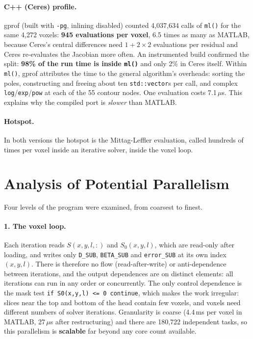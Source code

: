 \documentclass[11pt]{article}
\begin{document}
\paragraph{C++ (Ceres) profile.} gprof (built with \texttt{-pg}, inlining disabled) counted
4,037,634 calls of \texttt{ml()} for the same 4,272 voxels: \textbf{945 evaluations per voxel},
6.5 times as many as MATLAB, because Ceres's central differences need $1 + 2\times2$
evaluations per residual and Ceres re-evaluates the Jacobian more often. An instrumented build
confirmed the split: \textbf{98\% of the run time is inside \texttt{ml()}} and only 2\% in Ceres
itself. Within \texttt{ml()}, gprof attributes the time to the general algorithm's overheads:
sorting the poles, constructing and freeing about ten \texttt{std::vector}s per call, and complex
\texttt{log}/\texttt{exp}/\texttt{pow} at each of the 55 contour nodes. One evaluation costs
7.1\,$\mu$s. This explains why the compiled port is \emph{slower} than MATLAB.

\paragraph{Hotspot.} In both versions the hotspot is the Mittag-Leffler evaluation, called
hundreds of times per voxel inside an iterative solver, inside the voxel loop.

\section{Analysis of Potential Parallelism}
\label{sec:analysis}

Four levels of the program were examined, from coarsest to finest.

\paragraph{1. The voxel loop.} Each iteration reads $S(x,y,l,:)$ and $S_0(x,y,l)$, which are
read-only after loading, and writes only \texttt{D\_SUB}, \texttt{BETA\_SUB} and
\texttt{error\_SUB} at its own index $(x,y,l)$. There is therefore no flow (read-after-write)
or anti-dependence between iterations, and the output dependences are on distinct elements:
all iterations can run in any order or concurrently. The only control dependence is the mask
test \texttt{if S0(x,y,l) <= 0 continue}, which makes the work irregular: slices near the top
and bottom of the head contain few voxels, and voxels need different numbers of solver
iterations. Granularity is coarse (4.4\,ms per voxel in MATLAB, 27\,$\mu$s after
restructuring) and there are 180,722 independent tasks, so this parallelism is
\textbf{scalable} far beyond any core count available.
\end{document}
